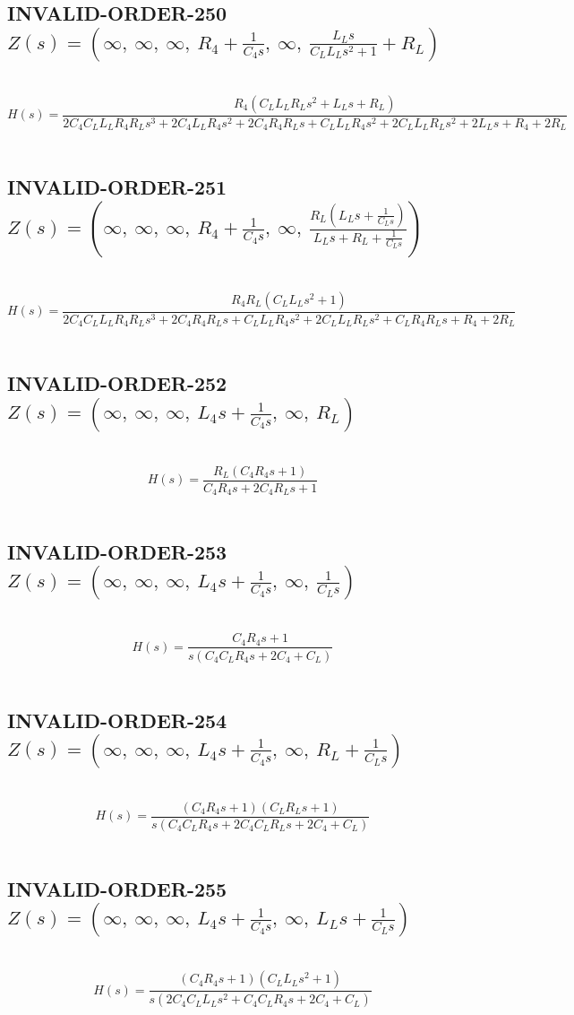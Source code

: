 \documentclass{article}
\begin{document}
\subsection{INVALID-ORDER-250 $Z(s) = \left( \infty, \  \infty, \  \infty, \  R_{4} + \frac{1}{C_{4} s}, \  \infty, \  \frac{L_{L} s}{C_{L} L_{L} s^{2} + 1} + R_{L}\right)$ } \ 
\textbf{\[H(s) = \frac{R_{4} \left(C_{L} L_{L} R_{L} s^{2} + L_{L} s + R_{L}\right)}{2 C_{4} C_{L} L_{L} R_{4} R_{L} s^{3} + 2 C_{4} L_{L} R_{4} s^{2} + 2 C_{4} R_{4} R_{L} s + C_{L} L_{L} R_{4} s^{2} + 2 C_{L} L_{L} R_{L} s^{2} + 2 L_{L} s + R_{4} + 2 R_{L}}\] } \ 
\subsection{INVALID-ORDER-251 $Z(s) = \left( \infty, \  \infty, \  \infty, \  R_{4} + \frac{1}{C_{4} s}, \  \infty, \  \frac{R_{L} \left(L_{L} s + \frac{1}{C_{L} s}\right)}{L_{L} s + R_{L} + \frac{1}{C_{L} s}}\right)$ } \ 
\textbf{\[H(s) = \frac{R_{4} R_{L} \left(C_{L} L_{L} s^{2} + 1\right)}{2 C_{4} C_{L} L_{L} R_{4} R_{L} s^{3} + 2 C_{4} R_{4} R_{L} s + C_{L} L_{L} R_{4} s^{2} + 2 C_{L} L_{L} R_{L} s^{2} + C_{L} R_{4} R_{L} s + R_{4} + 2 R_{L}}\] } \ 
\subsection{INVALID-ORDER-252 $Z(s) = \left( \infty, \  \infty, \  \infty, \  L_{4} s + \frac{1}{C_{4} s}, \  \infty, \  R_{L}\right)$ } \ 
\textbf{\[H(s) = \frac{R_{L} \left(C_{4} R_{4} s + 1\right)}{C_{4} R_{4} s + 2 C_{4} R_{L} s + 1}\] } \ 
\subsection{INVALID-ORDER-253 $Z(s) = \left( \infty, \  \infty, \  \infty, \  L_{4} s + \frac{1}{C_{4} s}, \  \infty, \  \frac{1}{C_{L} s}\right)$ } \ 
\textbf{\[H(s) = \frac{C_{4} R_{4} s + 1}{s \left(C_{4} C_{L} R_{4} s + 2 C_{4} + C_{L}\right)}\] } \ 
\subsection{INVALID-ORDER-254 $Z(s) = \left( \infty, \  \infty, \  \infty, \  L_{4} s + \frac{1}{C_{4} s}, \  \infty, \  R_{L} + \frac{1}{C_{L} s}\right)$ } \ 
\textbf{\[H(s) = \frac{\left(C_{4} R_{4} s + 1\right) \left(C_{L} R_{L} s + 1\right)}{s \left(C_{4} C_{L} R_{4} s + 2 C_{4} C_{L} R_{L} s + 2 C_{4} + C_{L}\right)}\] } \ 
\subsection{INVALID-ORDER-255 $Z(s) = \left( \infty, \  \infty, \  \infty, \  L_{4} s + \frac{1}{C_{4} s}, \  \infty, \  L_{L} s + \frac{1}{C_{L} s}\right)$ } \ 
\textbf{\[H(s) = \frac{\left(C_{4} R_{4} s + 1\right) \left(C_{L} L_{L} s^{2} + 1\right)}{s \left(2 C_{4} C_{L} L_{L} s^{2} + C_{4} C_{L} R_{4} s + 2 C_{4} + C_{L}\right)}\] } \ 
\end{document}
